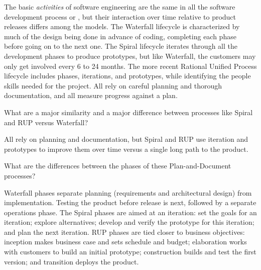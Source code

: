 \begin{summary}
 The basic \emph{activities} of software engineering are the same in all the software development process or , but their interaction over time relative to product releases differs among the models. The Waterfall lifecycle is characterized by much of the design being done in advance of coding, completing each phase before going on to the next one. The Spiral lifecycle iterates through all the development phases to produce prototypes, but like Waterfall, the customers may only get involved every 6 to 24 months. The more recent Rational Unified Process lifecycle includes phases, iterations, and prototypes, while identifying the people skills needed for the project. All rely on careful planning and thorough documentation, and all measure progress against a plan.
\end{summary}

\begin{checkyourself}
  What are a major similarity and a major difference between processes like Spiral and RUP versus Waterfall?
  \begin{answer}
  All rely on planning and documentation, but Spiral and RUP use iteration and prototypes to improve them over time versus a single long path to the product.
  \end{answer}
\end{checkyourself}

\begin{checkyourself}
  What are the differences between the phases of these Plan-and-Document processes?
  \begin{answer}
  Waterfall phases separate planning (requirements and architectural design) from implementation. Testing the product before release is next, followed by a separate operations phase. The Spiral phases are aimed at an iteration: set the goals for an iteration; explore alternatives; develop and verify the prototype for this iteration; and plan the next iteration. RUP phases are tied closer to business objectives: inception makes business case and sets schedule and budget; elaboration works with customers to build an initial prototype; construction builds and test the first version; and transition deploys the product.
  \end{answer}
\end{checkyourself}

